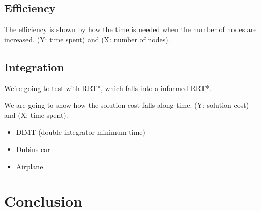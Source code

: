 \documentclass[letterpaper, 10 pt, conference]{ieeeconf}  %
\begin{document}
\subsection{Efficiency}

The efficiency is shown by how the time is needed when the number of nodes are increased.
(Y: time spent) and (X: number of nodes).

\subsection{Integration}

We're going to test with RRT*, which falls into a informed RRT*.

We are going to show how the solution cost falls along time.
(Y: solution cost) and (X: time spent).

\begin{itemize}
\item DIMT (double integrator minimum time)
\item Dubins car
\item Airplane
\end{itemize}

\section{Conclusion}








%
\end{document}
